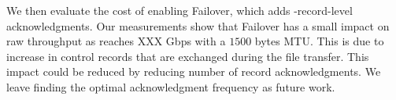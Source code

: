 
We then evaluate the cost of enabling Failover, which adds \tcpls-record-level 
acknowledgments. %
Our measurements show that Failover has a small impact on raw throughput as
\tcpls reaches XXX Gbps with a $1500$ bytes MTU.
This is due to increase in control records that are exchanged during the file 
transfer.
This impact could be reduced by reducing number of record acknowledgments. We 
leave finding the optimal acknowledgment frequency as future work.



